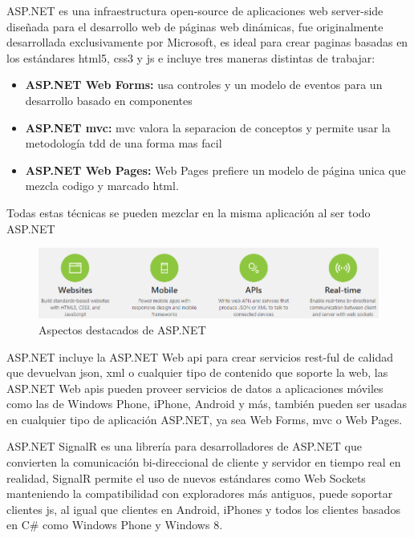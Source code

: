 ASP.NET\cite{asp.net} es una infraestructura open-source de aplicaciones web server-side diseñada para el desarrollo web de páginas web dinámicas, fue originalmente desarrollada exclusivamente por Microsoft, es ideal para crear paginas basadas en los estándares \acrshort{html}5, \acrshort{css}3 y \acrfull{js} e incluye tres maneras distintas de trabajar:

\begin{itemize}

\item \textbf{ASP.NET Web Forms:} usa controles y un modelo de eventos para un desarrollo basado en componentes

\item \textbf{ASP.NET \acrshort{mvc}:} \acrshort{mvc} valora la separacion de conceptos y permite usar la metodología \acrshort{tdd} de una forma mas facil

\item \textbf{ASP.NET Web Pages:} Web Pages prefiere un modelo de página unica que mezcla codigo y marcado \acrshort{html}.

\end{itemize}

Todas estas técnicas se pueden mezclar en la misma aplicación al ser todo ASP.NET

\begin{figure}[!htbp]
	\centering
	\includegraphics[scale=0.6]{fig/asp-net_highlights}
	\caption{Aspectos destacados de ASP.NET}
\end{figure}

\FloatBarrier

ASP.NET incluye la ASP.NET Web \acrshort{api} para crear servicios \acrshort{rest}-ful de calidad que devuelvan \acrshort{json}, \acrshort{xml} o cualquier tipo de contenido que soporte la web, las ASP.NET Web \acrshort{api}s pueden proveer servicios de datos a aplicaciones móviles como las de Windows Phone, iPhone, Android y más, también pueden ser usadas en cualquier tipo de aplicación ASP.NET, ya sea Web Forms, \acrshort{mvc} o Web Pages.

ASP.NET SignalR es una librería para desarrolladores de ASP.NET que convierten la comunicación bi-direccional de cliente y servidor en tiempo real en realidad, SignalR permite el uso de nuevos estándares como Web Sockets manteniendo la compatibilidad con exploradores más antiguos, puede soportar clientes \acrfull{js}, al igual que clientes en Android, iPhones y todos los clientes basados en C\# como Windows Phone y Windows 8.

